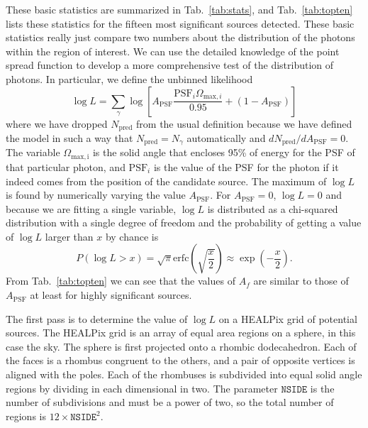 \documentclass[useAMS,usenatbib]{mn2e}
\begin{document}
These basic statistics are summarized in Tab.~\ref{tab:stats}, and
Tab.~\ref{tab:topten} lists these statistics for the fifteen most
significant sources detected.  These basic statistics really just
compare two numbers about the distribution of the photons within the
region of interest.  We can use the detailed knowledge of the point
spread function to develop a more comprehensive test of the
distribution of photons.  In particular, we define the unbinned
likelihood \citep[this is very similar to the expression used by][for neutrino telescopes]{2008APh....29..299B}
\begin{equation}
  \log L = \sum_\gamma \log \left [ A_\mathrm{PSF} \frac{\mathrm{PSF}_i \Omega_{\mathrm{max},i} }{0.95} + (1
    - A_\mathrm{PSF}) \right ]
  \label{eq:14}
\end{equation}
where we have dropped $N_\mathrm{pred}$ from the usual definition
because we have defined the model in such a way that
$N_\mathrm{pred}=N_\gamma$ automatically and $d
N_\mathrm{pred}/dA_\mathrm{PSF}=0$.  The variable
$\Omega_\mathrm{max,i}$ is the solid angle that encloses 95\% of
energy for the PSF of that particular photon, and $\mathrm{PSF}_i$
is the value of the PSF for the photon if it indeed comes from the
position of the candidate source.  The maximum of $\log L$ is found
by numerically varying the value $A_\mathrm{PSF}$.  For
$A_\mathrm{PSF}=0$, $\log L=0$ and because we are fitting a single
variable, $\log L$ is distributed as a chi-squared distribution with
a single degree of freedom and the probability of getting a value of
$\log L$ larger than $x$ by chance is
\begin{equation}
  P(\log L > x) = \sqrt{\pi} \mathrm{erfc} \left ( \sqrt{\frac{x}{2}}
  \right ) \approx \exp \left (-\frac{x}{2} \right ).
  \label{eq:15}
\end{equation}
From Tab.~\ref{tab:topten} we can see that the values of $A_f$ are
similar to those of $A_\mathrm{PSF}$ at least for highly significant
sources.

The first pass is to determine the value of $\log L$ on a HEALPix grid
\citep{2005ApJ...622..759G} of potential sources.  The HEALPix grid is
an array of equal area regions on a sphere, in this case the sky.  The
sphere is first projected onto a rhombic dodecahedron.  Each of the
faces is a rhombus congruent to the others, and a pair of opposite
vertices is aligned with the poles.  Each of the rhombuses is
subdivided into equal solid angle regions by dividing in each
dimensional in two.  The parameter $\mathtt{NSIDE}$ is the number of
subdivisions and must be a power of two, so the total number of
regions is $12 \times \mathtt{NSIDE}^2$.
\end{document}
